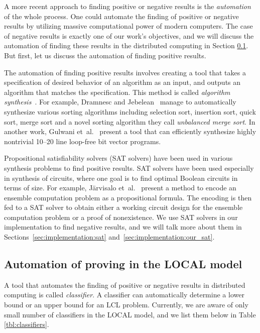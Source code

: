 A more recent approach to finding positive or negative results is the \emph{automation} of the whole process.
One could automate the finding of positive or negative results by utilizing massive computational power of modern computers.
The case of negative results is exactly one of our work's objectives, and we will discuss the automation of finding these results in the distributed computing in Section \ref{sec:prior_work:automation_of_proving_in_local_model}.
But first, let us discuss the automation of finding positive results.

The automation of finding positive results involves creating a tool that takes a specification of desired behavior of an algorithm as an input, and outputs an algorithm that matches the specification.
This method is called \emph{algorithm synthesis}~\cite{DBLP:phd/basesearch/Rybicki16}.
For example, Dramnesc and Jebelean\ \cite{DBLP:journals/jsc/DramnescJ15} manage to automatically synthesize various sorting algorithms including selection sort, insertion sort, quick sort, merge sort and a novel sorting algorithm they call \emph{unbalanced merge sort}.
In another work, Gulwani et~al.\ \cite{DBLP:conf/pldi/GulwaniJTV11} present a tool that can efficiently synthesize highly nontrivial 10--20 line loop-free bit vector programs.

Propositional satisfiability solvers (SAT solvers) have been used in various synthesis problems to find positive results.
SAT solvers have been used especially in synthesis of circuits, where one goal is to find optimal Boolean circuits in terms of size.
For example, Järvisalo et~al.\ \cite{DBLP:conf/sat/JarvisaloKKK12} present a method to encode an ensemble computation problem as a propositional formula.
The encoding is then fed to a SAT solver to obtain either a working circuit design for the ensemble computation problem or a proof of nonexistence.
We use SAT solvers in our implementation to find negative results, and we will talk more about them in Sections~\ref{sec:implementation:sat} and~\ref{sec:implementation:our_sat}.


\subsection{Automation of proving in the LOCAL model} \label{sec:prior_work:automation_of_proving_in_local_model}


A tool that automates the finding of positive or negative results in distributed computing is called \emph{classifier}.
A classifier can automatically determine a lower bound or an upper bound for an LCL problem.
Currently, we are aware of only small number of classifiers in the LOCAL model, and we list them below in Table \ref{tbl:classifiers}.

